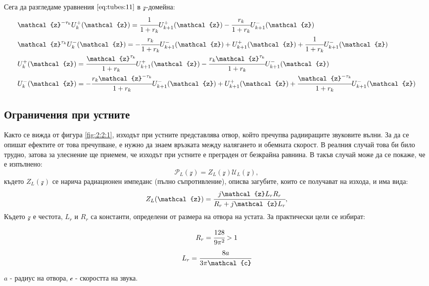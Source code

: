 \documentclass[main.tex]{subfiles}
\begin{document}
Сега да разгледаме уравнения $\eqref{eq:tubes:11}$ в $\mathcal{z}$-домейна:
\begin{subequations}
    \label{eq:tubes:12}
    \begin{align}
        & \nonumber \mathcal{z}^{-\tau_k}U_k^{+}(\mathcal{z}) = \cfrac{1}{1 + r_k} U_{k+1}^{+}(\mathcal{z}) - \cfrac{r_k}{1+r_k} U_{k+1}^{-}(\mathcal{z}) \\
        & \nonumber \mathcal{z}^{\tau_k} U_k^{-}(\mathcal{z}) = - \cfrac{r_k}{1+r_k} U_{k+1}^{-}(\mathcal{z}) + U_{k+1}^{+}(\mathcal{z}) + \cfrac{1}{1 + r_k} U_{k+1}^{-}(\mathcal{z}) \\
        & U_k^{+}(\mathcal{z}) = \cfrac{\mathcal{z}^{\tau_k}}{1 + r_k} U_{k+1}^{+}(\mathcal{z}) - \cfrac{r_k\mathcal{z}^{\tau_k}}{1+r_k} U_{k+1}^{-}(\mathcal{z})\\
        & U_k^{-}(\mathcal{z}) = - \cfrac{r_k\mathcal{z}^{-\tau_k} }{1+r_k} U_{k+1}^{-}(\mathcal{z}) + U_{k+1}^{+}(\mathcal{z}) + \cfrac{\mathcal{z}^{-\tau_k} }{1 + r_k} U_{k+1}^{-}(\mathcal{z})
    \end{align}
\end{subequations}

\subsection{Ограничения при устните}
Както се вижда от фигура \autoref{fig:2:2:1}, изходът при устните представлява отвор, който
пречупва радииращите звуковите вълни.
За да се опишат ефектите от това пречупване, е нужно да знаем връзката между
налягането и обемната скорост. В реалния случай това би било трудно, затова за улеснение
ще приемем, че изходът при устните е преграден от безкрайна равнина. В такъв случай може
да се покаже, че е изпълнено:
\begin{equation}
    \label{eq:tubes:13}
    \mathcal{P}_L(\mathcal{z}) = Z_L(\mathcal{z}) \mathcal{U}_L(\mathcal{z}),
\end{equation}
където 
$Z_L(\mathcal{z})$ се нарича радиационен импеданс (пълно съпротивление), описва загубите, които се получават на изхода, и има вида:
\[
    Z_L(\mathcal{z}) = \cfrac{j\mathcal{z} L_r R_r}{R_r + j\mathcal{z} L_r},    
\]
Където $\mathcal{z}$ е честота, $L_r$ и $R_r$ са константи, определени от размера на отвора на устата. За практически цели се избират:

\begin{multicols}{2}
    \begin{equation*}
      R_r = \cfrac{128}{9\pi^2} > 1
    \end{equation*}\break
    \begin{equation*}
      L_r = \cfrac{8a}{3\pi \mathcal{c}}
    \end{equation*}
  \end{multicols}
$a$ - радиус на отвора, $\mathcal{c}$ - скоростта на звука.
\end{document}
